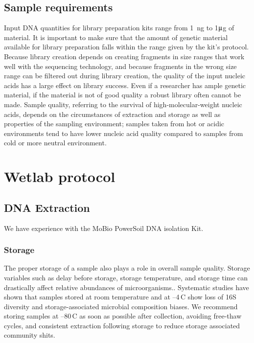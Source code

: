 \documentclass[graybox]{svmult}
\begin{document}
\subsection{Sample requirements }
\label{subsec:4}
%
Input DNA quantities for library preparation kits range from 1~ng to  1$\umu$g of material. It is important to make sure that the amount of genetic material available for library preparation falls within the range given by the kit's protocol.
%
Because library creation depends on creating fragments in size ranges that work well with the sequencing technology, and because fragments in the wrong size range can be filtered out during library creation,  the quality of the input nucleic acids has a large effect on library success. 
Even if a researcher has ample genetic material, if the material is not of good quality a robust library often cannot be made. 
Sample quality, referring to the survival of high-molecular-weight nucleic acids, depends on the circumstances of extraction and storage as well as properties of the sampling environment; samples taken from hot or acidic environments tend to have lower nucleic acid quality compared to samples from cold or more neutral environment.


\section{Wetlab protocol}

\subsection{DNA Extraction}
We have experience with the MoBio PowerSoil DNA isolation Kit.    

\subsubsection{Storage}
The proper storage of a sample also plays a role in overall sample quality.  Storage variables such as delay before storage, storage temperature, and storage time can drastically affect relative abundances of microorganisms.. Systematic studies have shown that samples stored at room temperature and at --4\degree\,C show loss of 16S diversity and storage-associated microbial composition biases\cite{Rubin2013Investigating}.  We recommend storing samples at --80\degree\,C as soon as possible after collection, avoiding free-thaw cycles, and consistent extraction following storage to reduce storage associated community shits.  
\end{document}
